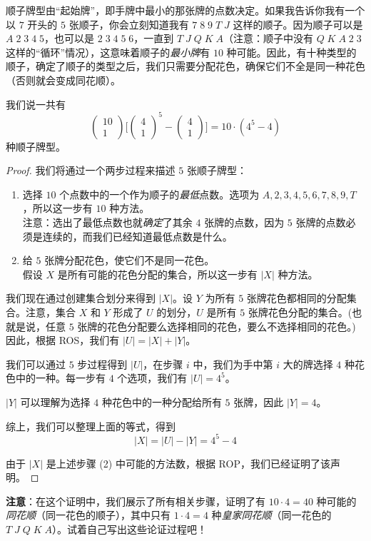 \begin{example}[顺子]

    顺子牌型由``起始牌''，即手牌中最小的那张牌的点数决定。如果我告诉你我有一个以 $7$ 开头的 $5$ 张顺子，你会立刻知道我有 $7\;8\;9\;T\;J$ 这样的顺子。因为顺子可以是 $A\;2\;3\;4\;5$，也可以是 $2\;3\;4\;5\;6$，一直到 $T\;J\;Q\;K\;A$（注意：顺子中没有 $Q\;K\;A\;2\;3$ 这样的``循环''情况），这意味着顺子的\emph{最小牌}有 $10$ 种可能。因此，有十种类型的顺子，确定了顺子的类型之后，我们只需要分配花色，确保它们不全是同一种花色（否则就会变成同花顺）。

    我们说一共有
    \[\begin{pmatrix}
            10 \\
            1
        \end{pmatrix}\Bigg[\begin{pmatrix}
                4 \\
                1
            \end{pmatrix}^5 - \begin{pmatrix}
                4 \\
                1
            \end{pmatrix}\Bigg]=10 \cdot (4^5-4)\]
    种顺子牌型。

    \begin{proof}
        我们将通过一个两步过程来描述 $5$ 张顺子牌型：
        \begin{enumerate}[label=(\arabic*)]
            \item 选择 $10$ 个点数中的一个作为顺子的\emph{最低}点数。选项为 $A,2,3,4,5,6,7,8,9,T$，所以这一步有 $10$ 种方法。\\
                  注意：选出了最低点数也就\emph{确定}了其余 $4$ 张牌的点数，因为 $5$ 张牌的点数必须是连续的，而我们已经知道最低点数是什么。
            \item 给 $5$ 张牌分配花色，使它们不是同一花色。\\
                  假设 $X$ 是所有可能的花色分配的集合，所以这一步有 $|X|$ 种方法。
        \end{enumerate}

        我们现在通过创建集合划分来得到 $|X|$。设 $Y$ 为所有 $5$ 张牌花色都相同的分配集合。注意，集合 $X$ 和 $Y$ 形成了 $U$ 的划分，$U$ 是所有 $5$ 张牌花色分配的集合。(也就是说，任意 $5$ 张牌的花色分配要么选择相同的花色，要么不选择相同的花色。) 因此，根据 ROS，我们有 $|U| = |X| + |Y|$。

        我们可以通过 $5$ 步过程得到 $|U|$，在步骤 $i$ 中，我们为手中第 $i$ 大的牌选择 $4$ 种花色中的一种。每一步有 $4$ 个选项，我们有 $|U| = 4^5$。

        $|Y|$ 可以理解为选择 $4$ 种花色中的一种分配给所有 $5$ 张牌，因此 $|Y| = 4$。

        综上，我们可以整理上面的等式，得到
        \[|X| = |U| - |Y| = 4^5 - 4\]

        由于 $|X|$ 是上述步骤 (2) 中可能的方法数，根据 ROP，我们已经证明了该声明。
    \end{proof}

    \textbf{注意}：在这个证明中，我们展示了所有相关步骤，证明了有 $10 \cdot 4 = 40$ 种可能的\emph{同花顺}（同一花色的顺子），其中只有 $1 \cdot 4 = 4$ 种\emph{皇家同花顺}（同一花色的 $T\;J\;Q\;K\;A$）。试着自己写出这些论证过程吧！
\end{example}